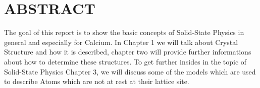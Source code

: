\section{ABSTRACT}

The goal of this report is to show the basic concepts of Solid-State Physics in general and especially for Calcium. In Chapter 1 we will talk about Crystal Structure and how it is described, chapter two will provide further informations about how to determine these structures.
To get further insides in the topic of Solid-State Physics Chapter 3, we will discuss some of the models which are used to describe Atoms which are not at rest at their lattice site.

